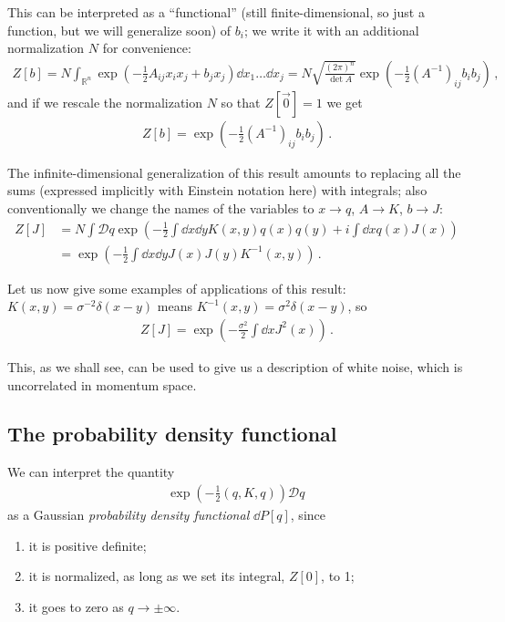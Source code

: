 \documentclass[main.tex]{subfiles}
\begin{document}
This can be interpreted as a ``functional'' (still finite-dimensional, so just a function, but we will generalize soon) of \(b_i\); we write it with an additional normalization \(N\) for convenience:
%
\begin{align}
Z[b] = N \int _{\mathbb{R}^{n}} \exp(- \frac{1}{2} A_{ij} x_i x_j + b_j x_j) \dd{x_1 } \dots \dd{x_j}
= N \sqrt{\frac{(2 \pi )^{n}}{\det A}} \exp(- \frac{1}{2} (A^{-1})_{ij}b_i b_j)
\,,
\end{align}
%
and if we rescale the normalization \(N\) so that \(Z[\vec{0}] = 1 \) we get 
%
\begin{align}
Z[b] = \exp(- \frac{1}{2} (A^{-1})_{ij}b_i b_j)
\,.
\end{align}

The infinite-dimensional generalization of this result amounts to replacing all the sums (expressed implicitly with Einstein notation here) with integrals; also conventionally we change the names of the variables to \(x \to q\), \(A \to K\), \(b \to J\): 
%
\begin{align}
Z[J] &= N \int \mathcal{D}q \exp(- \frac{1}{2} \int \dd{x} \dd{y} K(x, y) q(x) q(y) + i \int \dd{x} q(x) J(x))  \\
&= \exp(- \frac{1}{2} \int \dd{x} \dd{y} J(x) J(y) K^{-1}(x, y))
\,.
\end{align}

Let us now give some examples of applications of this result: \(K(x,y) = \sigma^{-2} \delta (x-y)\) means \(K^{-1}(x,y) = \sigma^2 \delta (x-y) \), so 
%
\begin{align}
Z[J] = \exp(- \frac{\sigma^2}{2} \int \dd{x} J^2(x))
\,.
\end{align}

This, as we shall see, can be used to give us a description of white noise, which is uncorrelated in momentum space.

\subsection{The probability density functional}

We can interpret the quantity 
%
\begin{align}
\exp(- \frac{1}{2} (q, K, q)) \mathcal{D}q
\,
\end{align}
%
as a Gaussian \emph{probability density functional} \(\dd{P}[q]\), since 
\begin{enumerate}
    \item it is positive definite;
    \item it is normalized, as long as we set its integral, \(Z[0]\), to 1;
    \item it goes to zero as \(q \to \pm \infty \).
\end{enumerate}
\end{document}
